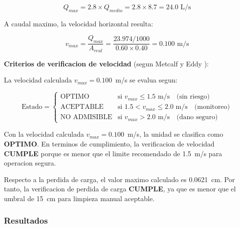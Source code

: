 \documentclass[12pt,a4paper]{article}
\begin{document}
\begin{equation}
Q_{{max}} = 2.8 \times Q_{{medio}} = 2.8 \times 8.7 = 24.0 \text{ L/s}
\end{equation}

A caudal maximo, la velocidad horizontal resulta:

\begin{equation}
v_{{max}} = \frac{Q_{{max}}}{A_{{real}}} = \frac{23.974/1000}{0.60 \times 0.40} = 0.100 \text{ m/s}
\end{equation}

\textbf{Criterios de verificacion de velocidad} (segun Metcalf y Eddy \cite{metcalf2014}):

La velocidad calculada $v_{{max}} = 0.100$~m/s se evalua segun:

\begin{equation}
\text{Estado} = \begin{cases}
    \text{OPTIMO} & \text{si } v_{{max}} \leq 1.5 \text{ m/s} \quad \text{(sin riesgo)} \\
    \text{ACEPTABLE} & \text{si } 1.5 < v_{{max}} \leq 2.0 \text{ m/s} \quad \text{(monitoreo)} \\
    \text{NO ADMISIBLE} & \text{si } v_{{max}} > 2.0 \text{ m/s} \quad \text{(dano seguro)}
\end{cases}
\end{equation}

Con la velocidad calculada $v_{{max}} = 0.100$~m/s, la unidad se clasifica como \textbf{OPTIMO}. En terminos de cumplimiento, la verificacion de velocidad \textbf{CUMPLE} porque es menor que el limite recomendado de 1.5~m/s para operacion segura.

Respecto a la perdida de carga, el valor maximo calculado es 0.0621~cm. Por tanto, la verificacion de perdida de carga \textbf{CUMPLE}, ya que es menor que el umbral de 15~cm para limpieza manual aceptable.

\subsubsection{Resultados}
\end{document}
